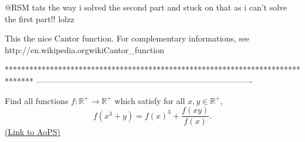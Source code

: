 \begin{solution}
	@RSM tats the way i solved the second part and stuck on that as i can't solve the first part!! lolzz
\end{solution}



\begin{solution}
	This the nice Cantor function.
For complementary informations, see http://en.wikipedia.org\/wiki\/Cantor_function
\end{solution}
*******************************************************************************
-------------------------------------------------------------------------------

\begin{problem}
	Find all functions $f: \mathbb R^+ \to \mathbb R^+$ which satisfy for all $x, y \in \mathbb R^+$,
\[f(x^3+y)=f(x)^3 + \frac{f(xy)}{f(x)}.\]
	\flushright \href{https://artofproblemsolving.com/community/c6h393579}{(Link to AoPS)}
\end{problem}




